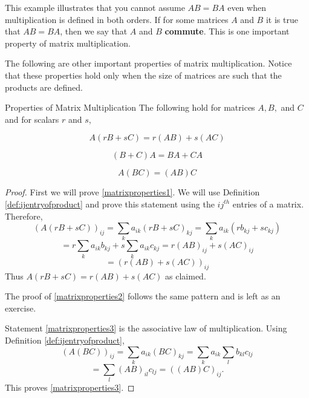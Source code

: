This example illustrates that you cannot assume $AB=BA$ even when
multiplication is defined in both orders. If for some matrices $A$ and
$B$ it is true that $AB=BA$, then we say that $A$ and $B$ \textbf{commute}. This is one 
important property of matrix multiplication.

The following are other important properties of matrix multiplication.
Notice that these properties hold only when the size of matrices are such that the products are defined. 

\begin{proposition}{Properties of Matrix Multiplication}\label{prop:propertiesofmatrixmultiplication}
The following hold for matrices $A,B,$ and $C$ and for scalars $r$ and $s$,

\begin{equation}
A\left( rB+sC\right) =r\left( AB\right) +s\left( AC\right)  \label{matrixproperties1}
\end{equation}

\begin{equation}
\left( B+C\right) A=BA+CA  \label{matrixproperties2}
\end{equation}

\begin{equation}
A\left( BC\right) =\left( AB\right) C  \label{matrixproperties3}
\end{equation}
\end{proposition}

\ifdefined\showproofs
\begin{proof}
 First we will prove \ref{matrixproperties1}. We will use Definition \ref{def:ijentryofproduct} 
and prove this statement using the $ij^{th}$ entries of a matrix. 
Therefore, 
\begin{equation*}
\left( A\left( rB+sC\right) \right) _{ij}=\sum_{k}a_{ik}\left( rB+sC\right)
_{kj}=\sum_{k}a_{ik}\left( rb_{kj}+sc_{kj}\right)
\end{equation*}
\begin{equation*}
=r\sum_{k}a_{ik}b_{kj}+s\sum_{k}a_{ik}c_{kj}=r\left( AB\right) _{ij}+s\left(
AC\right) _{ij}
\end{equation*}
\begin{equation*}
=\left( r\left( AB\right) +s\left( AC\right) \right) _{ij}
\end{equation*}
Thus $A\left( rB+sC\right) =r(AB)+s(AC)$ as claimed. 

The proof of \ref{matrixproperties2} follows the same pattern and is left as an exercise. 

Statement \ref{matrixproperties3} is the associative law of multiplication. Using
Definition \ref{def:ijentryofproduct},
\begin{equation*}
\left( A\left( BC\right) \right) _{ij}=\sum_{k}a_{ik}\left( BC\right)
_{kj}=\sum_{k}a_{ik}\sum_{l}b_{kl}c_{lj}
\end{equation*}
\begin{equation*}
=\sum_{l}\left( AB\right) _{il}c_{lj}=\left( \left( AB\right) C\right) _{ij}.
\end{equation*}
This proves \ref{matrixproperties3}.
\end{proof}
\fi